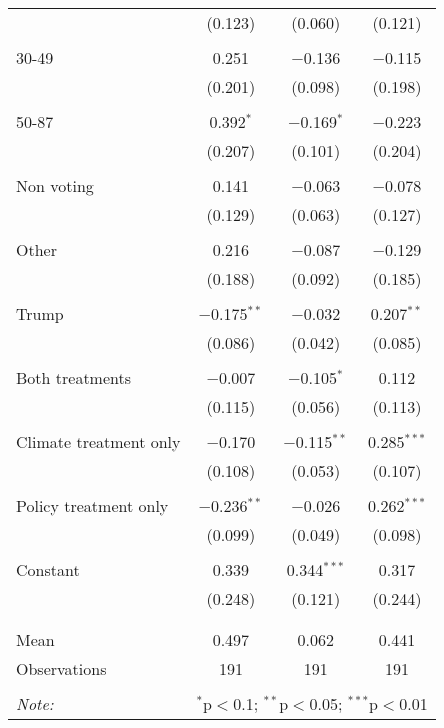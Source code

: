 \begin{tabular}{@{\extracolsep{5pt}}lccc}
  & (0.123) & (0.060) & (0.121) \\ 
  & & & \\ 
 30-49 & 0.251 & $-$0.136 & $-$0.115 \\ 
  & (0.201) & (0.098) & (0.198) \\ 
  & & & \\ 
 50-87 & 0.392$^{*}$ & $-$0.169$^{*}$ & $-$0.223 \\ 
  & (0.207) & (0.101) & (0.204) \\ 
  & & & \\ 
 Non voting & 0.141 & $-$0.063 & $-$0.078 \\ 
  & (0.129) & (0.063) & (0.127) \\ 
  & & & \\ 
 Other & 0.216 & $-$0.087 & $-$0.129 \\ 
  & (0.188) & (0.092) & (0.185) \\ 
  & & & \\ 
 Trump & $-$0.175$^{**}$ & $-$0.032 & 0.207$^{**}$ \\ 
  & (0.086) & (0.042) & (0.085) \\ 
  & & & \\ 
 Both treatments & $-$0.007 & $-$0.105$^{*}$ & 0.112 \\ 
  & (0.115) & (0.056) & (0.113) \\ 
  & & & \\ 
 Climate treatment only & $-$0.170 & $-$0.115$^{**}$ & 0.285$^{***}$ \\ 
  & (0.108) & (0.053) & (0.107) \\ 
  & & & \\ 
 Policy treatment only & $-$0.236$^{**}$ & $-$0.026 & 0.262$^{***}$ \\ 
  & (0.099) & (0.049) & (0.098) \\ 
  & & & \\ 
 Constant & 0.339 & 0.344$^{***}$ & 0.317 \\ 
  & (0.248) & (0.121) & (0.244) \\ 
  & & & \\ 
\hline \\[-1.8ex] 
Mean & 0.497 & 0.062 & 0.441 \\ 
Observations & 191 & 191 & 191 \\ 
\hline 
\hline \\[-1.8ex] 
\textit{Note:}  & \multicolumn{3}{r}{$^{*}$p$<$0.1; $^{**}$p$<$0.05; $^{***}$p$<$0.01} \\ 
\end{tabular} 
